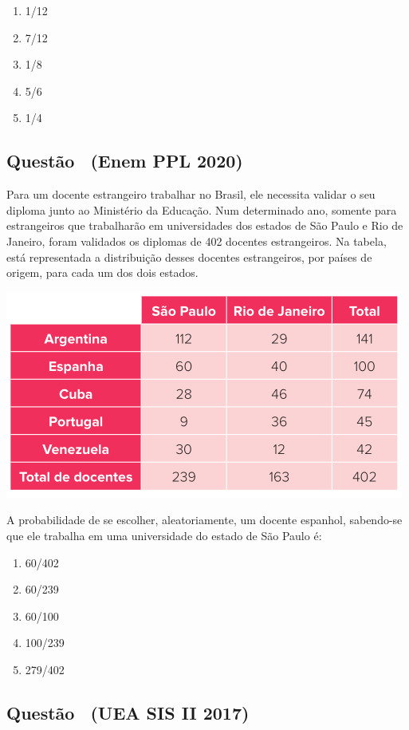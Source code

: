 \documentclass[12pt]{article}
\newcounter{questao}
\newcommand{\novaquestao}[1]{%
	\stepcounter{questao}%
	\subsection*{Questão \thequestao\ (#1)}%
}
\begin{document}
\begin{multicols}{2}
			\begin{enumerate}[label=(\alph*), noitemsep]
				\item {1}/{12}
				\item {7}/{12}
				\item {1}/{8}
				\item {5}/{6}
				\item {1}/{4}
			\end{enumerate}
		
		\novaquestao{Enem PPL 2020}
		
			Para um docente estrangeiro trabalhar no Brasil, ele necessita validar o seu diploma junto ao Ministério da Educação. Num determinado ano, somente para estrangeiros que trabalharão em universidades dos estados de São Paulo e Rio de Janeiro, foram validados os diplomas de 402 docentes estrangeiros. Na 
			tabela, está representada a distribuição desses docentes estrangeiros, por países de origem, para cada um dos dois estados.
			
			\begin{center}
				\includegraphics[scale=0.5]{imagens/enem-ppl-2020.png}
			\end{center} A probabilidade de se escolher, aleatoriamente, um docente espanhol, sabendo-se que ele trabalha em uma universidade do estado de São Paulo é:
			
			\begin{enumerate}[label=(\alph*), noitemsep]
				\item {60}/{402}
				\item {60}/{239}
				\item {60}/{100}
				\item {100}/{239}
				\item {279}/{402}
			\end{enumerate}
			
		\novaquestao{UEA SIS II 2017}
		

\end{multicols}
\end{document}
